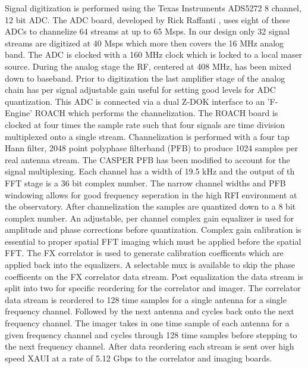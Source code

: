 \documentclass[useAMS,macros,usenatbib,onecolumn]{mn2e}
\begin{document}
Signal digitization is performed using the Texas Instruments ADS5272 8 channel, 12 bit ADC.
The ADC board, developed by Rick Raffanti \citep{}, uses eight of these ADCs to channelize 64 streams at up to 65 Msps.
In our design only 32 signal streams are digitized at 40 Msps which more then covers the 16 MHz analog band.
The ADC is clocked with a 160 MHz clock which is locked to a local maser source.
During the analog stage the RF, centered at 408 MHz, has been mixed down to baseband.
Prior to digitization the last amplifier stage of the analog chain has per signal adjustable gain useful for setting good levels for ADC quantization.
This ADC is connected via a dual Z-DOK interface to an 'F-Engine' ROACH which performs the channelization.
The ROACH board is clocked at four times the sample rate such that four signals are time division multiplexed onto a single stream.
Channelization is performed with a four tap Hann filter, 2048 point polyphase filterband (PFB) to produce 1024 samples per real antenna stream.
The CASPER PFB has been modified to account for the signal multiplexing.
Each channel has a width of 19.5 kHz and the output of th FFT stage is a 36 bit complex number.
The narrow channel widths and PFB windowing allows for good frequency seperation in the high RFI environment at the observatory.
After channelization the samples are quantized down to a 8 bit complex number.
An adjustable, per channel complex gain equalizer is used for amplitude and phase corrections before quantization.
Complex gain calibration is essential to proper spatial FFT imaging which must be applied before the spatial FFT.
The FX correlator is used to generate calibration coefficents which are applied back into the equalizers.
A selectable mux is available to skip the phase coefficents on the FX correlator data stream.
Post equalization the data stream is split into two for specific reordering for the correlator and imager.
The correlator data stream is reordered to 128 time samples for a single antenna for a single frequency channel.
Followed by the next antenna and cycles back onto the next frequency channel.
The imager takes in one time sample of each antenna for a given frequency channel and cycles through 128 time samples before stepping to the next frequency channel.
After data reordering each stream is sent over high speed XAUI at a rate of 5.12 Gbps to the correlator and imaging boards.
\end{document}
